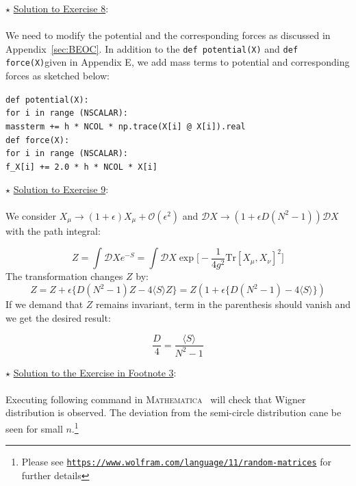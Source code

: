 \documentclass[letter,11pt]{article}
\newcommand{\MA}{\textsc{Mathematica}}
\newcommand\tab[1][1cm]{\hspace*{#1}}
\begin{document}
\noindent $\star$ \ul{Solution to Exercise 8}:
\\  \\ 
We need to modify the potential and the corresponding forces as discussed in Appendix~\ref{sec:BEOC}. In addition to the \verb"def potential(X)" 
and \verb"def force(X)"given in Appendix E, we add mass terms to potential and corresponding forces as sketched below: 

\begin{footnotesize} 

\begin{mdframed}[backgroundcolor=blue!3] 
 \verb"def potential(X):" \\
 \tab	\verb"for i in range (NSCALAR):" \\ 
    \tab     \tab	\verb"massterm += h * NCOL * np.trace(X[i] @ X[i]).real" \\
    
\vspace{5mm} 
\noindent
\verb"def force(X):" \\ 
\tab	\verb"for i in range (NSCALAR):"  \\ 
       \tab  \tab 	\verb"f_X[i] += 2.0 * h * NCOL * X[i] " 
\end{mdframed}
\end{footnotesize} 

\noindent $\star$ \ul{Solution to Exercise 9}:
\\ \\ 
We consider $ X_{\mu} \to (1 + \epsilon) X_{\mu} + \mathcal{O}(\epsilon^2)$
and $\mathcal{D}X \to (1 + \epsilon D (N^2-1))\mathcal{D}X$ with the path integral:

\begin{equation}
	Z = \int \mathcal{D}X e^{-S} = \int \mathcal{D}X \exp\Big[-\frac{1}{4g^2} \mbox{Tr} [X_\mu,X_\nu]^2\Big]
\end{equation}
The transformation changes $Z$ by:
\begin{equation}
	Z = Z + \epsilon \Big\{ D(N^2 -1)Z - 4\langle S \rangle Z  \Big\} = Z ( 1 + \epsilon \Big\{ D(N^2 -1) - 4\langle S \rangle   \Big\})
\end{equation}
If we demand that $Z$ remains invariant, term in the parenthesis should vanish and we get the desired result:

\begin{equation}
	\frac{D}{4} = \frac{\langle S \rangle}{N^2 - 1 }
\end{equation}  
           
\noindent $\star$ \ul{Solution to the Exercise in Footnote 3}:
\\  \\
Executing following command in \MA~ will check that Wigner distribution is 
observed. The deviation from the semi-circle distribution cane be seen for small 
$n$.\footnote{Please see \texttt{\href{https://www.wolfram.com/language/11/random-matrices}{https://www.wolfram.com/language/11/random-matrices}} for further details}
\end{document}

